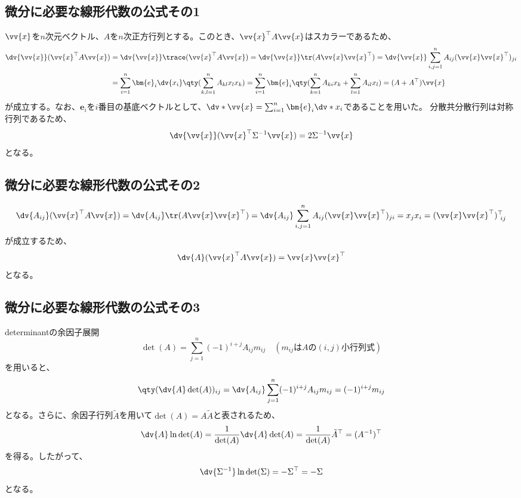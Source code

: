 \documentclass[a4paper,11pt,uplatex]{jsarticle}%
\begin{document}
\subsection{微分に必要な線形代数の公式その1}
$\vv{x}$を$n$次元ベクトル、$A$を$n$次正方行列とする。このとき、$\vv{x}^{\top}A\vv{x}$はスカラーであるため、
\begin{align}
  \dv{\vv{x}}(\vv{x}^{\top}A\vv{x}) & = \dv{\vv{x}}\trace(\vv{x}^{\top}A\vv{x}) = \dv{\vv{x}}\tr(A\vv{x}\vv{x}^{\top})
  = \dv{\vv{x}}\sum_{i,j=1}^{n}A_{ij}(\vv{x}\vv{x}^{\top})_{ji} \notag                                                 \\
                                    & = \sum_{i=1}^{n}\bm{e}_{i}\dv{x_i}\qty(\sum_{k,l=1}^{n}A_{kl}x_lx_k)
  = \sum_{i=1}^{n}\bm{e}_{i}\qty(\sum_{k=1}^{n}A_{ki}x_k + \sum_{l=1}^{n}A_{il}x_l) = (A+A^{\top})\vv{x}
\end{align}
が成立する。なお、$\bm{e}_i$を$i$番目の基底ベクトルとして、$\dv*{\vv{x}} = \sum_{i=1}^{n}\bm{e}_i\dv*{x_i}$であることを用いた。
分散共分散行列は対称行列であるため、
\begin{equation}
  \dv{\vv{x}}(\vv{x}^{\top}\Sigma^{-1}\vv{x}) = 2\Sigma^{-1}\vv{x}
\end{equation}
となる。
\subsection{微分に必要な線形代数の公式その2}
\begin{equation}
  \dv{A_{ij}}(\vv{x}^{\top}A\vv{x})  = \dv{A_{ij}}\tr(A\vv{x}\vv{x}^{\top})
  = \dv{A_{ij}}\sum_{i,j=1}^{n}A_{ij}(\vv{x}\vv{x}^{\top})_{ji} = x_jx_i = (\vv{x}\vv{x}^{\top})^{\top}_{~ij}
\end{equation}
が成立するため、
\begin{equation}
  \dv{A}(\vv{x}^{\top}A\vv{x})  = \vv{x}\vv{x}^{\top}
\end{equation}
となる。
\subsection{微分に必要な線形代数の公式その3}
determinantの余因子展開
\begin{equation}
  \det(A) = \sum_{j=1}^{n}(-1)^{i+j}A_{ij}m_{ij}\quad(m_{ij}\text{は$A\text{の}(i,j)$小行列式})
\end{equation}
を用いると、
\begin{equation}
  \qty(\dv{A}\det(A))_{ij} = \dv{A_{ij}}\sum_{j=1}^{n}(-1)^{i+j}A_{ij}m_{ij}=(-1)^{i+j}m_{ij}
\end{equation}
となる。さらに、余因子行列$\tilde{A}$を用いて$\det(A) = A\tilde{A}$と表されるため、
\begin{equation}
  \dv{A}\ln{\det(A)} = \frac{1}{\det(A)}\dv{A}\det(A) = \frac{1}{\det(A)}\tilde{A}^{\top} = (A^{-1})^{\top}
\end{equation}
を得る。したがって、
\begin{equation}
  \dv{\Sigma^{-1}}\ln{\det(\Sigma)} = -\Sigma^{\top} = -\Sigma
\end{equation}
となる。
\end{document}

